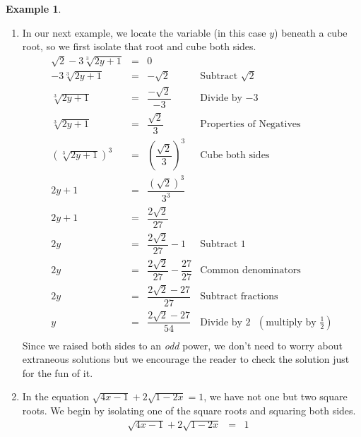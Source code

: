 \documentclass[11pt]{article}
\theoremstyle{definition}  %
\newtheorem{ex}{\bf Example}
\begin{document}
\begin{ex}
\begin{enumerate}
\item  In our next example, we locate the variable (in this case $y$) beneath a cube root, so we first isolate that root and cube both sides. \[ \begin{array}{rclr}


\sqrt{2} - 3\sqrt[3]{2y+1} &  = &  0 & \\[2pt]

- 3\sqrt[3]{2y+1} &  = &  - \sqrt{2} & \text{Subtract $\sqrt{2}$} \\[2pt]

\sqrt[3]{2y+1} & = & \dfrac{-\sqrt{2}}{-3} & \text{Divide by $-3$} \\[8pt]

\sqrt[3]{2y+1} & = & \dfrac{\sqrt{2}}{3}  & \text{Properties of Negatives} \\[8pt]

(\sqrt[3]{2y+1})^3 & = & \left( \dfrac{\sqrt{2}}{3} \right)^{3} & \text{Cube both sides} \\[12pt]

2y + 1 & = & \dfrac{(\sqrt{2})^3}{3^3} & \\[8pt]

2y + 1 & = & \dfrac{2\sqrt{2}}{27} & \\ [8pt]
2y  & = & \dfrac{2 \sqrt{2}}{27}  - 1 & \text{Subtract $1$} \\[8pt]

2y  & = & \dfrac{2 \sqrt{2}}{27}  - \dfrac{27}{27} & \text{Common denominators} \\ [8pt]

2y  & = & \dfrac{2 \sqrt{2} - 27}{27} & \text{Subtract fractions} \\[8pt]

y  & = & \dfrac{2 \sqrt{2} - 27}{54} & \text{Divide by $2$ $\left(\text{multiply by $\frac{1}{2}$} \right)$} \\

\end{array}\] Since we raised both sides to an \textit{odd} power, we don't need to worry about extraneous solutions but we encourage the reader to check the solution just for the fun of it.

\item In the equation $\sqrt{4x-1}  + 2\sqrt{1 - 2x} = 1$, we have not one but two square roots.  We begin by isolating one of the square roots and squaring both sides.\[ \begin{array}{rclr}

\sqrt{4x-1}  + 2\sqrt{1 - 2x} & = & 1 & \\ [2pt]


\end{array}\]
\end{enumerate}
\end{ex}
\end{document}

